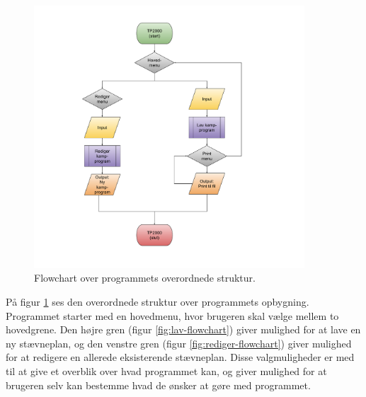 \begin{figure}[H]
  \centering
  \includegraphics[width=0.9\textwidth]{figures/Overordnet.pdf}
  \caption{Flowchart over programmets overordnede struktur.}
  \label{fig:overordnet-flowchart}
\end{figure}

På figur \ref{fig:overordnet-flowchart} ses den overordnede struktur over programmets opbygning. Programmet starter med en hovedmenu, hvor brugeren skal vælge mellem to hovedgrene. Den højre gren (figur \ref{fig:lav-flowchart}) giver mulighed for at lave en ny stævneplan, og den venstre gren (figur \ref{fig:rediger-flowchart}) giver mulighed for at redigere en allerede eksisterende stævneplan. Disse valgmuligheder er med til at give et overblik over hvad programmet kan, og giver mulighed for at brugeren selv kan bestemme hvad de ønsker at gøre med programmet.

